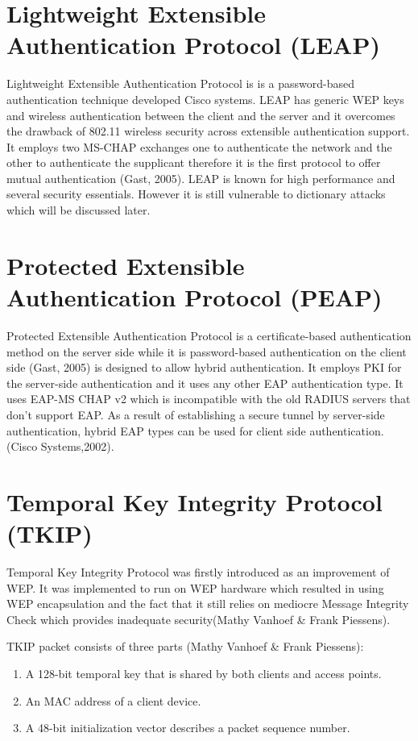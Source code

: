 \section{Lightweight Extensible Authentication Protocol (LEAP)}
Lightweight Extensible Authentication Protocol is  is a password-based authentication technique developed Cisco systems. LEAP has generic WEP keys and wireless authentication between the client and the server and it overcomes the drawback of 802.11 wireless security across extensible authentication support. It employs two MS-CHAP exchanges one to authenticate the network and the other to authenticate the supplicant therefore it is the first protocol to offer mutual authentication (Gast, 2005). LEAP is known for high performance and several security essentials. However it is still vulnerable to dictionary attacks which will be discussed later.



\section{Protected Extensible Authentication Protocol (PEAP)}

Protected Extensible Authentication Protocol is a certificate-based authentication method on the server side while it is password-based authentication on the client side (Gast, 2005) is designed to allow hybrid authentication. It employs PKI for the server-side authentication and it uses any other EAP authentication type. It uses EAP-MS CHAP v2 which is incompatible with the old RADIUS servers that don't support EAP. As a result of establishing a secure tunnel by server-side authentication, hybrid EAP types can be used for client side authentication. (Cisco Systems,2002).

\section{Temporal Key Integrity Protocol (TKIP)}

Temporal Key Integrity Protocol was firstly introduced as an improvement of WEP. It was implemented to run on WEP hardware which resulted in using WEP encapsulation and the fact that it still relies on mediocre Message Integrity Check which provides inadequate security(Mathy Vanhoef \& Frank Piessens).

TKIP packet consists of three parts (Mathy Vanhoef \& Frank Piessens):

\begin{enumerate}
  \item A 128-bit temporal key that is shared by both clients and access points.
  \item An MAC address of a client device.
  \item A 48-bit initialization vector describes a packet sequence number.
\end{enumerate}
